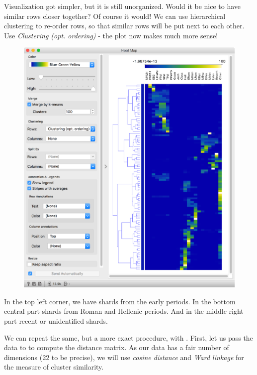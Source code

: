 Visualization got simpler, but it is still unorganized. Would it be nice to have similar rows closer together? Of course it would! We can use hierarchical clustering to re-order rows, so that similar rows will be put next to each other. Use \textit{Clustering (opt. ordering)} - the plot now makes much more sense!

\begin{figure}
    \vspace{-0.1cm}
    \includegraphics[scale=0.4]{heat-map-clustered.png}
\end{figure}

In the top left corner, we have shards from the early periods. In the bottom central part shards from Roman and Hellenic periods. And in the middle right part recent or unidentified shards.

We can repeat the same, but a more exact procedure, with . First, let us pass the data to  to compute the distance matrix. As our data has a fair number of dimensions (22 to be precise), we will use \textit{cosine distance} and \textit{Ward linkage} for the measure of cluster similarity.


